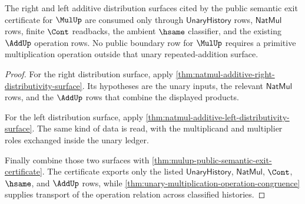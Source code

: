 \begin{theorem}
\label{thm:mulup-unary-additive-distributive-boundary}
The right and left additive distribution surfaces cited by the public semantic
exit certificate for $\MulUp$ are consumed only through
$\mathsf{UnaryHistory}$ rows, $\mathsf{NatMul}$ rows, finite $\Cont$ readbacks,
the ambient $\hsame$ classifier, and the existing $\AddUp$ operation rows. No
public boundary row for $\MulUp$ requires a primitive multiplication operation
outside that unary repeated-addition surface.
\end{theorem}
\begin{proof}
For the right distribution surface, apply
\autoref{thm:natmul-additive-right-distributivity-surface}. Its hypotheses are
the unary inputs, the relevant $\mathsf{NatMul}$ rows, and the $\AddUp$ rows
that combine the displayed products.

For the left distribution surface, apply
\autoref{thm:natmul-additive-left-distributivity-surface}. The same kind of
data is read, with the multiplicand and multiplier roles exchanged inside the
unary ledger.

Finally combine those two surfaces with
\autoref{thm:mulup-public-semantic-exit-certificate}. The certificate exports
only the listed $\mathsf{UnaryHistory}$, $\mathsf{NatMul}$, $\Cont$, $\hsame$,
and $\AddUp$ rows, while
\autoref{thm:unary-multiplication-operation-congruence} supplies transport of
the operation relation across classified histories.
\end{proof}
